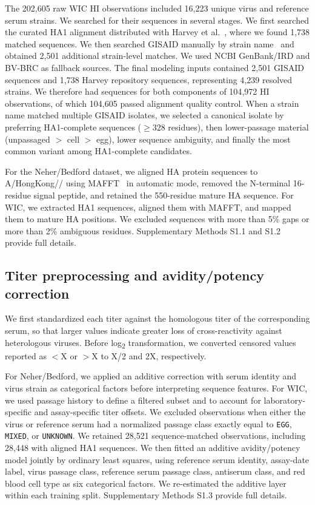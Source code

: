 \documentclass[12pt]{article}
\begin{document}
The 202{,}605 raw WIC HI observations included 16{,}223 unique virus and reference serum strains. We searched for their sequences in several stages. We first searched the curated HA1 alignment distributed with Harvey et al.~\cite{Harvey2023PLoSComputBiol}, where we found 1{,}738 matched sequences. We then searched GISAID manually by strain name~\cite{Elbe2017GlobChall, Shu2017EuroSurveillance} and obtained 2{,}501 additional strain-level matches. We used NCBI GenBank/IRD and BV-BRC as fallback sources. The final modeling inputs contained 2{,}501 GISAID sequences and 1{,}738 Harvey repository sequences, representing 4{,}239 resolved strains. We therefore had sequences for both components of 104{,}972 HI observations, of which 104{,}605 passed alignment quality control. When a strain name matched multiple GISAID isolates, we selected a canonical isolate by preferring HA1-complete sequences ($\geq 328$ residues), then lower-passage material (unpassaged $>$ cell $>$ egg), lower sequence ambiguity, and finally the most common variant among HA1-complete candidates.

For the Neher/Bedford dataset, we aligned HA protein sequences to A/\allowbreak HongKong// using MAFFT~\cite{Katoh2013MolBiolEvol} in automatic mode, removed the N-terminal 16-residue signal peptide, and retained the 550-residue mature HA sequence. For WIC, we extracted HA1 sequences, aligned them with MAFFT, and mapped them to mature HA positions. We excluded sequences with more than 5\% gaps or more than 2\% ambiguous residues. Supplementary Methods S1.1 and S1.2 provide full details.

\subsection{Titer preprocessing and avidity/potency correction}

We first standardized each titer against the homologous titer of the corresponding serum, so that larger values indicate greater loss of cross-reactivity against heterologous viruses. Before log\textsubscript{2} transformation, we converted censored values reported as $<$X or $>$X to X/2 and 2X, respectively.

For Neher/Bedford, we applied an additive correction with serum identity and virus strain as categorical factors before interpreting sequence features. For WIC, we used passage history to define a filtered subset and to account for laboratory-specific and assay-specific titer offsets. We excluded observations when either the virus or reference serum had a normalized passage class exactly equal to \texttt{EGG}, \texttt{MIXED}, or \texttt{UNKNOWN}. We retained 28{,}521 sequence-matched observations, including 28{,}448 with aligned HA1 sequences. We then fitted an additive avidity/potency model jointly by ordinary least squares, using reference serum identity, assay-date label, virus passage class, reference serum passage class, antiserum class, and red blood cell type as six categorical factors. We re-estimated the additive layer within each training split. Supplementary Methods S1.3 provide full details.
\end{document}
